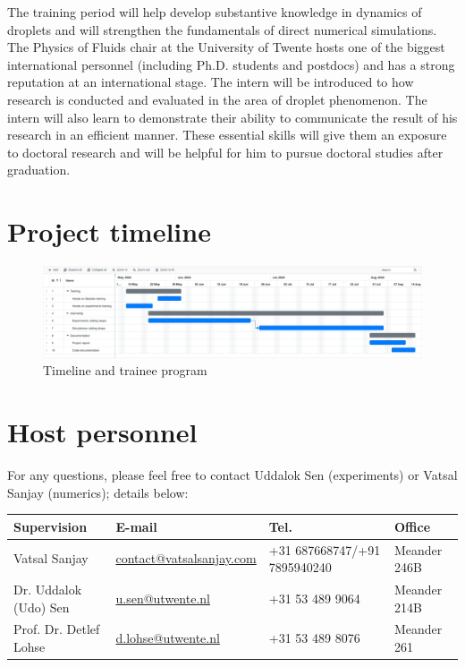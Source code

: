 \documentclass[a4paper,10pt]{article}
\begin{document}
The training period will help develop substantive knowledge in dynamics of droplets and will strengthen the fundamentals of direct numerical simulations. The Physics of Fluids chair at the University of Twente hosts one of the biggest international personnel (including Ph.D. students and postdocs) and has a strong reputation at an international stage. The intern will be introduced to how research is conducted and evaluated in the area of droplet phenomenon. The intern will also learn to demonstrate their ability to communicate the result of his research in an efficient manner. These essential skills will give them an exposure to doctoral research and will be helpful for him to pursue doctoral studies after graduation.


\section*{Project timeline}
\begin{figure}[H]
	\includegraphics[width=\textwidth]{OnlineGantt2022045.pdf}
	\caption{Timeline and trainee program}
\end{figure}

\section*{Host personnel}

For any questions, please feel free to contact Uddalok Sen (experiments) or Vatsal Sanjay (numerics); details below: 

\begin{center}
	\begin{tabular}{|l|l|l|l|}
		\hline \textbf{Supervision} & \textbf{E-mail} & \textbf{Tel.} & \textbf{Office} \\ 
		\hline Vatsal Sanjay & \href{mailto:contact@vatsalsanjay.com}{contact@vatsalsanjay.com} & +31 687668747/+91 7895940240 & Meander 246B \\ 
		\hline Dr. Uddalok (Udo) Sen & \href{mailto:u.sen@utwente.nl}{u.sen@utwente.nl} & +31 53 489 9064 & Meander 214B \\ 
		\hline Prof. Dr. Detlef Lohse & \href{mailto:d.lohse@utwente.nl}{d.lohse@utwente.nl} & +31 53 489 8076 & Meander 261 \\ 
		\hline 
	\end{tabular} 
\end{center}
\end{document}
